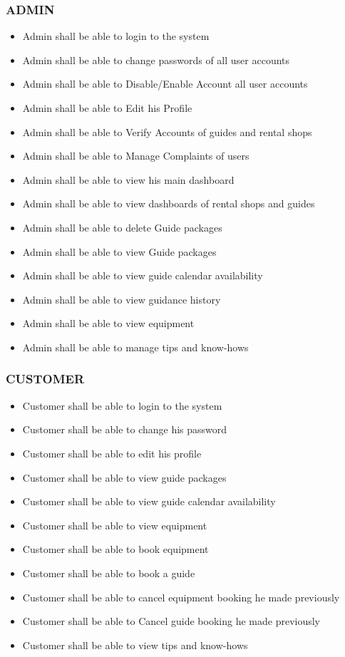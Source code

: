 \subsubsection*{ADMIN}
\begin{itemize}
\itemsep0em 
    \item Admin shall be able to login to the system
    \item Admin shall be able to change passwords of all user accounts
    \item Admin shall be able to Disable/Enable Account all user accounts
    \item Admin shall be able to Edit his Profile
    \item Admin shall be able to Verify Accounts of guides and rental shops
    \item Admin shall be able to Manage Complaints of users
    \item Admin shall be able to view his main dashboard
    \item Admin shall be able to view dashboards of rental shops and guides
    \item Admin shall be able to delete Guide packages
    \item Admin shall be able to view Guide packages
    \item Admin shall be able to view guide calendar availability
    \item Admin shall be able to view guidance history
    \item Admin shall be able to view equipment
    \item Admin shall be able to manage tips and know-hows
\end{itemize}
\newpage
\subsubsection*{CUSTOMER}
\begin{itemize}
\itemsep0em 
    \item Customer shall be able to login to the system
    \item Customer shall be able to change his password 
    \item Customer shall be able to edit his profile
    \item Customer shall be able to view guide packages
    \item Customer shall be able to view guide calendar availability
    \item Customer shall be able to view equipment
    \item Customer shall be able to book equipment
    \item Customer shall be able to book a guide
    \item Customer shall be able to cancel equipment booking he made previously
    \item Customer shall be able to Cancel guide booking he made previously
    \item Customer shall be able to view tips and know-hows
\end{itemize}

